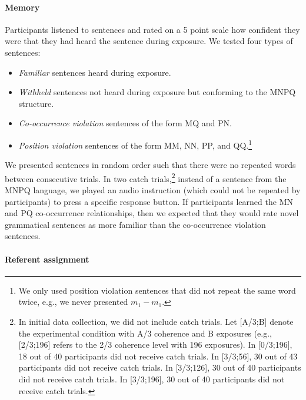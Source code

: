 \documentclass[man,floatsintext]{apa6}
\begin{document}
\paragraph{Memory}
Participants listened to sentences and rated on a 5 point scale how confident they were that they had heard the sentence during exposure. We tested four types of sentences:

\begin{itemize}
\item \emph{Familiar} sentences heard during exposure.
\item \emph{Withheld} sentences not heard during exposure but conforming to the MNPQ structure.
\item \emph{Co-occurrence violation} sentences of the form MQ and PN.
\item \emph{Position violation} sentences of the form MM, NN, PP, and QQ.\footnote{ We only used position violation sentences that did not repeat the same word twice, e.g., we never presented $m_1 - m_1$.}
\end{itemize}

We presented sentences in random order such that there were no repeated words between consecutive trials. In two catch trials,\footnote{\label{catch-trials} In initial data collection, we did not include catch trials.  Let [A/3;B] denote the experimental condition with A/3 coherence and B exposures (e.g., [2/3;196] refers to the 2/3 coherence level with 196 exposures). In [0/3;196], 18 out of 40 participants did not receive catch trials. In [3/3;56], 30 out of 43 participants did not receive catch trials. In [3/3;126], 30 out of 40 participants did not receive catch trials. In [3/3;196], 30 out of 40 participants did not receive catch trials.} instead of a sentence from the MNPQ language, we played an audio instruction (which could not be repeated by participants) to press a specific response button.  If participants learned the MN and PQ co-occurrence relationships, then we expected that they would rate novel grammatical sentences as more familiar than the co-occurrence violation sentences.

\paragraph{Referent assignment}
\end{document}

